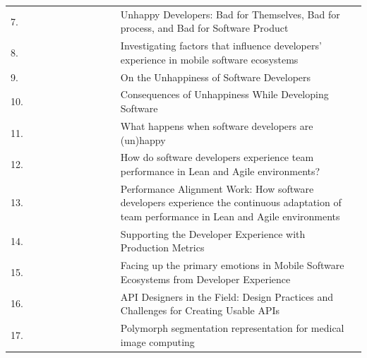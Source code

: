 \documentclass[english, 12pt, a4paper, sci, utf8, a-1b, online]{aaltothesis}
\begin{document}
\begin{center}
\begin{longtable}{p{0.05\linewidth}p{0.25\linewidth}p{0.7\linewidth}}
    7.  & \cite{unhappy-developers}                         & Unhappy Developers: Bad for Themselves, Bad for process, and Bad for Software Product                                                       \\
    8.  & \cite{fontao2017investigating}                    & Investigating factors that influence developers' experience in mobile software ecosystems                                                   \\
    9.  & \cite{on-the-unhappiness}                         & On the Unhappiness of Software Developers                                                                                                   \\
    10. & \cite{consequences-of-unhappiness}                & Consequences of Unhappiness While Developing Software                                                                                       \\
    11. & \cite{what-happens-when-unhappy}                  & What happens when software developers are (un)happy                                                                                         \\
    12. & \cite{how-developers-experience-team-performance} & How do software developers experience team performance in Lean and Agile environments?                                                      \\
    13. & \cite{paw}                                        & Performance Alignment Work: How software developers experience the continuous adaptation of team performance in Lean and Agile environments \\
    14. & \cite{chatley2019supporting}                      & Supporting the Developer Experience with Production Metrics                                                                                 \\
    15. & \cite{fontao2017facing}                           & Facing up the primary emotions in Mobile Software Ecosystems from Developer Experience                                                      \\
    16. & \cite{api-designers}                              & API Designers in the Field: Design Practices and Challenges for Creating Usable APIs                                                        \\
    17. & \cite{pinter2019polymorph}                        & Polymorph segmentation representation for medical image computing                                                                           \\

\end{longtable}
\end{center}
\end{document}
